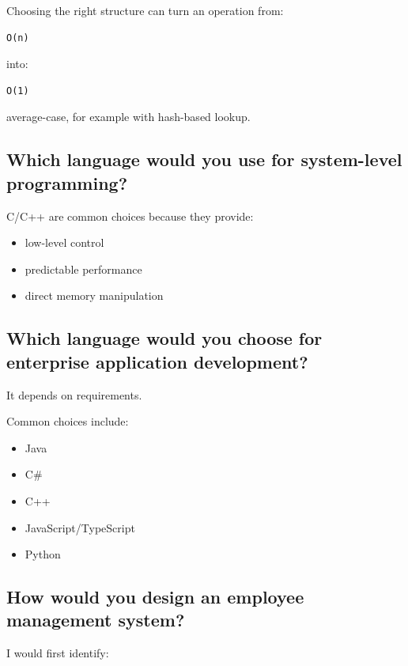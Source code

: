 Choosing the right structure can turn an operation from:

\begin{lstlisting}
O(n)
\end{lstlisting}

into:

\begin{lstlisting}
O(1)
\end{lstlisting}

average-case, for example with hash-based lookup.

\medskip

\subsection{Which language would you use for system-level programming?}

C/C++ are common choices because they provide:

\begin{itemize}
  \item low-level control
  \item predictable performance
  \item direct memory manipulation
\end{itemize}

\medskip

\subsection{Which language would you choose for enterprise application development?}

It depends on requirements.

Common choices include:

\begin{itemize}
  \item Java
  \item C\#
  \item C++
  \item JavaScript/TypeScript
  \item Python
\end{itemize}

\medskip

\subsection{How would you design an employee management system?}

I would first identify:

